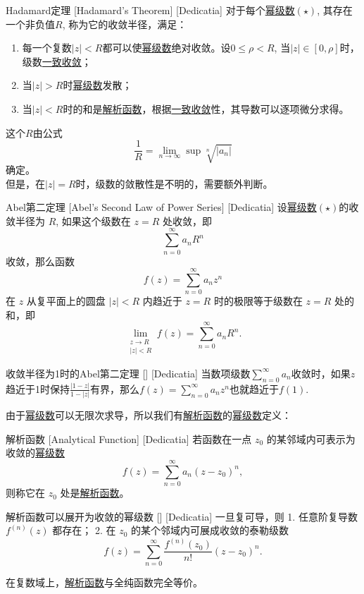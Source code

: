\documentclass[UTF8]{ctexart}
\newcommand{\AnalyticalFunction}{\hyperref[dfn:AnalyticalFunction]{解析函数}}
\newcommand{\PowerSeries}{\hyperref[dfn:PowerSeries]{幂级数}}
\newcommand{\UniformConvergence}{\hyperref[dfn:UniformConvergence]{一致收敛}}
\begin{document}
\begin{thm}
    [UUID]
    {Hadamard定理}
    [Hadamard's Theorem]
    [Dedicatia]
    对于每个\PowerSeries $(\star)$, 其存在一个非负值$R$, 称为它的收敛半径，满足：
    \begin{enumerate}
        \item 每一个复数$|z|<R$都可以使\PowerSeries 绝对收敛。设$0\leqslant\rho <R$, 当$|z|\in[0,\rho]$时，级数\UniformConvergence ；
        \item 当$|z|>R$时\PowerSeries 发散；
        \item 当$|z|<R$时的和是\AnalyticalFunction ，根据\UniformConvergence 性，其导数可以逐项微分求得。
    \end{enumerate}
    这个$R$由公式
    \[\frac{1}{R}=\lim_{n\to \infty}\sup\sqrt[n]{|a_n|}\]
    确定。\\
    但是，在$|z|=R$时，级数的敛散性是不明的，需要额外判断。
\end{thm}
\begin{thm}
    [UUID]
    {Abel第二定理}
    [Abel's Second Law of Power Series]
    [Dedicatia]
    设\PowerSeries $(\star)$的收敛半径为 \( R \), 如果这个级数在 \( z = R \) 处收敛，即
    \[\sum_{n=0}^{\infty} a_n R^n\]
    收敛，那么函数
    \[f(z) = \sum_{n=0}^{\infty} a_n z^n\]
    在 \( z \) 从复平面上的圆盘 \( |z| < R \) 内趋近于 \( z = R \) 时的极限等于级数在 \( z = R \) 处的和，即
    \[\lim_{\substack{z \to R \\ |z| < R}} f(z) = \sum_{n=0}^{\infty} a_n R^n.\]
\end{thm}
\begin{xmp}
    [UUID]
    {收敛半径为1时的Abel第二定理}
    []
    [Dedicatia]
    当数项级数$\sum\limits_{n=0}^\infty a_n$收敛时，如果$z$趋近于1时保持$\frac{|1-z|}{1-|z|}$有界，那么$f(z)=\sum\limits_{n=0}^\infty a_nz^n$也就趋近于$f(1)$.
\end{xmp}
由于\PowerSeries 可以无限次求导，所以我们有\AnalyticalFunction 的\PowerSeries 定义：
\begin{dfn}
    [UUID]
    {解析函数}
    [Analytical Function]
    [Dedicatia]
    若函数在一点 \(z_0\) 的某邻域内可表示为收敛的\PowerSeries   
    \[f(z)=\sum_{n=0}^{\infty}a_n(z-z_0)^n,\]  
    则称它在 \(z_0\) 处是\AnalyticalFunction 。  
\end{dfn}
\begin{ppt}
    [UUID]
    {解析函数可以展开为收敛的幂级数}
    []
    [Dedicatia]
    一旦复可导，则
    1. 任意阶复导数 \(f^{(n)}(z)\) 都存在；  
    2. 在 \(z_0\) 的某个邻域内可展成收敛的泰勒级数  
    \[f(z)=\sum_{n=0}^{\infty}\frac{f^{(n)}(z_0)}{n!}(z-z_0)^n.\]  
\end{ppt}
在复数域上，\AnalyticalFunction 与全纯函数完全等价。
\end{document}
